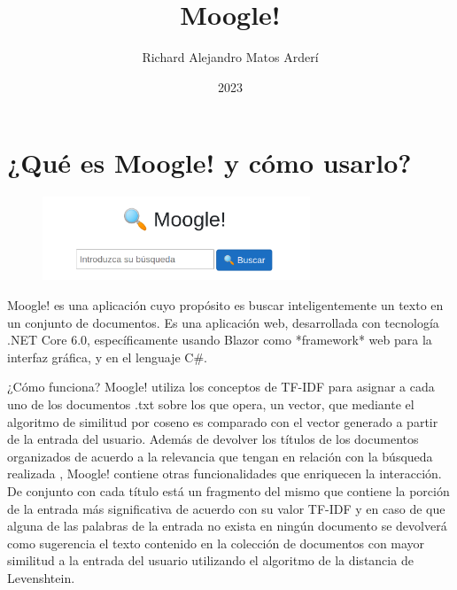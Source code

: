 \documentclass{beamer}
\title{Moogle!}
\subtitle{}
\institute{Facultad de Matemática y Computación\\Universidad de la Habana}
\author{Richard Alejandro Matos Arderí}
\date{2023}
\begin{document}
\maketitle

\begin{frame}
\tableofcontents
\end{frame}

\section{¿Qué es Moogle! y cómo usarlo?}

\begin{frame}
\begin{figure}[h]
       \center
       \includegraphics[width=8cm]{Web2.jpg}
\end{figure}
Moogle! es una aplicación cuyo propósito es buscar inteligentemente un texto en
un conjunto de documentos. Es una aplicación web, desarrollada con tecnología .NET
Core 6.0, específicamente usando Blazor como *framework* web para la interfaz
gráfica, y en el lenguaje C\#.
\end{frame}
\begin{frame}{¿Cómo funciona?}
Moogle! utiliza los conceptos de TF-IDF para asignar a cada uno de los documentos .txt sobre los que opera, un vector, que mediante el algoritmo de similitud por coseno es comparado con el vector generado a partir de la entrada del usuario. Además de devolver los títulos de los documentos organizados de acuerdo a la relevancia que tengan en relación con la búsqueda realizada , Moogle! contiene otras funcionalidades que enriquecen la interacción. De conjunto con cada título está un fragmento del mismo que contiene la porción de la entrada más significativa de acuerdo con su valor TF-IDF y en caso de que alguna de las palabras de la entrada no exista en ningún documento se devolverá como sugerencia el texto contenido en la colección de documentos con mayor similitud a la entrada del usuario utilizando el algoritmo de la distancia de Levenshtein.
\end{frame}
\end{document}
